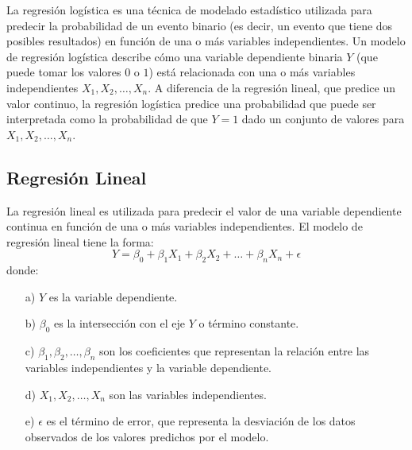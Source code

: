 \documentclass[a4paper]{report} %
\begin{document}
La regresión logística es una técnica de modelado estadístico utilizada para predecir la probabilidad de un evento binario (es decir, un evento que tiene dos posibles resultados) en función de una o más variables independientes.  Un modelo de regresión logística describe cómo una variable dependiente binaria $Y$ (que puede tomar los valores $0$ o $1$) está relacionada con una o más variables independientes $X_1, X_2, \ldots, X_n$. A diferencia de la regresión lineal, que predice un valor continuo, la regresión logística predice una probabilidad que puede ser interpretada como la probabilidad de que $Y=1$ dado un conjunto de valores para $X_1, X_2, \ldots, X_n$.

\subsection{Regresión Lineal}

La regresión lineal es utilizada para predecir el valor de una variable dependiente continua en función de una o más variables independientes. El modelo de regresión lineal tiene la forma:
\begin{equation}
Y = \beta_0 + \beta_1 X_1 + \beta_2 X_2 + \ldots + \beta_n X_n + \epsilon
\end{equation}
donde:
\begin{itemize}
    \item[a) ] $Y$ es la variable dependiente.
    \item[b) ] $\beta_0$ es la intersección con el eje $Y$ o término constante.
    \item[c) ] $\beta_1, \beta_2, \ldots, \beta_n$ son los coeficientes que representan la relación entre las variables independientes y la variable dependiente.
    \item[d) ] $X_1, X_2, \ldots, X_n$ son las variables independientes.
    \item[e) ] $\epsilon$ es el término de error, que representa la desviación de los datos observados de los valores predichos por el modelo.
\end{itemize}
\end{document}
